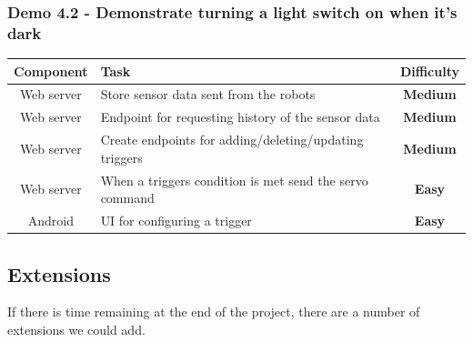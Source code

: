 \documentclass[onecolumn]{IEEEtran}
\newcommand{\easy}{{\color{green} \textbf{Easy}}}
\newcommand{\medium}{{\color{orange} \textbf{Medium}}}
\begin{document}
\subsubsection{Demo 4.2 - Demonstrate turning a light switch on when it’s dark}

\begin{center}
    \begin{tabularx}{0.8\linewidth}{|c|L|c|}
        \hline
        \textbf{Component} & \textbf{Task} & \textbf{Difficulty} \\
        \hline
        Web server & Store sensor data sent from the robots & \medium \\
        \hline
        Web server & Endpoint for requesting history of the sensor data & \medium \\
        \hline
        Web server & Create endpoints for adding/deleting/updating triggers & \medium \\
        \hline
        Web server & When a triggers condition is met send the servo command & \easy \\
        \hline
        Android & UI for configuring a trigger & \easy \\
        \hline
    \end{tabularx}
\end{center}

\subsection{Extensions}

If there is time remaining at the end of the project, there are a number of extensions we could add.
\end{document}
